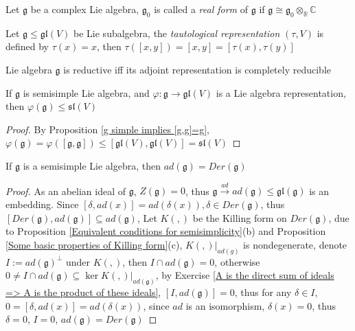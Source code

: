\documentclass[main]{subfiles}
\begin{document}
\begin{definition}
Let $\mathfrak{g}$ be a complex Lie algebra, $\mathfrak{g}_0$ is called a \textit{real form} of $\mathfrak{g}$ if $\mathfrak{g}\cong\mathfrak{g}_0\otimes_{\mathbb R}\mathbb C$
\end{definition}

\begin{example}
Let $\mathfrak{g}\leq\mathfrak{gl}(V)$ be Lie subalgebra, the \textit{tautological representation} $(\tau,V)$ is defined by $\tau(x)=x$, then $\tau([x,y])=[x,y]=[\tau(x),\tau(y)]$
\end{example}

\begin{proposition}
Lie algebra $\mathfrak{g}$ is reductive iff its adjoint representation is completely reducible
\end{proposition}

\begin{lemma}\label{g semisimple, phi:g->gl(V) representation => phi(g)<=sl(V)}
If $\mathfrak{g}$ is semisimple Lie algebra, and $\varphi:\mathfrak{g}\to\mathfrak{gl}(V)$ is a Lie algebra representation, then $\varphi(\mathfrak{g})\leq\mathfrak{sl}(V)$
\end{lemma}

\begin{proof}
By Proposition \ref{g simple implies [g,g]=g}, $\varphi(\mathfrak{g})=\varphi([\mathfrak{g},\mathfrak{g}])\leq[\mathfrak{gl}(V),\mathfrak{gl}(V)]=\mathfrak{sl}(V)$
\end{proof}

\begin{proposition}\label{Derivations of semisimple Lie algebra are inner derivations}
If $\mathfrak{g}$ is a semisimple Lie algebra, then $ad(\mathfrak g)= Der(\mathfrak{g})$
\end{proposition}

\begin{proof}
As an abelian ideal of $\mathfrak{g}$, $Z(\mathfrak{g})=0$, thus $\mathfrak{g}\xrightarrow{ad}ad(\mathfrak{g})\leq\mathfrak{gl}(\mathfrak{g})$ is an embedding. Since $[\delta,ad(x)]=ad(\delta(x)),\delta\in Der(\mathfrak{g})$, thus $[Der(\mathfrak{g}),ad(\mathfrak{g})]\subseteq ad(\mathfrak{g})$, Let $K(,)$ be the Killing form on $Der(\mathfrak{g})$, due to Proposition \ref{Equivalent conditions for semisimplicity}(b) and Proposition \ref{Some basic properties of Killing form}(c), $K(,)|_{ad(g)}$ is nondegenerate, denote $I:=ad(\mathfrak{g})^\perp$ under $K(,)$, then $I\cap ad(\mathfrak{g})=0$, otherwise $0\neq I\cap ad(\mathfrak{g})\subseteq\ker K(,)|_{ad(\mathfrak{g})}$, by Exercise \ref{A is the direct sum of ideals => A is the product of these ideals}, $[I,ad(\mathfrak{g})]=0$, thus for any $\delta\in I$, $0=[\delta,ad(x)]=ad(\delta(x))$, since $ad$ is an isomorphism, $\delta(x)=0$, thus $\delta=0$, $I=0$, $ad(\mathfrak{g})=Der(\mathfrak{g})$
\end{proof}
\end{document}
